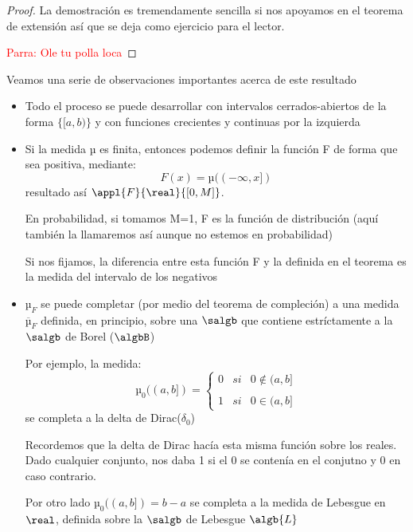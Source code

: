 \documentclass{apuntes}
\begin{document}
\begin{proof}
La demostración es tremendamente sencilla si nos apoyamos en el teorema de extensión así que se deja como ejercicio para el lector.

\textcolor{red}{Parra: Ole tu polla loca}
\end{proof}

Veamos una serie de observaciones importantes acerca de este resultado
\begin{obs}
\begin{itemize}
\item Todo el proceso se puede desarrollar con intervalos cerrados-abiertos de la forma $\{[a,b)\}$ y con funciones crecientes y continuas por la izquierda

\item Si la medida µ es finita, entonces podemos definir la función F de forma que sea positiva, mediante:
\[F(x)=µ((- \infty, x])\]
resultado así $\appl{F}{\real}{[0,M]}$.

En probabilidad, si tomamos M=1, F es la función de distribución (aquí también la llamaremos así aunque no estemos en probabilidad)

Si nos fijamos, la diferencia entre esta función F y la definida en el teorema es la medida del intervalo de los negativos

\item $µ_F$ se puede completar (por medio del teorema de compleción) a una medida $\overline{µ}_F$ definida, en principio, sobre una $\salgb$ que contiene estríctamente a la $\salgb$ de Borel ($\algbB$)

Por ejemplo, la medida:
\[µ_0((a,b])= \left\{ \begin{array}{lcc}
            0 &   si  & 0 \notin (a,b] \\
             \\  1 &  si & 0 \in (a,b]
             \end{array}
   \right.\]
se completa a la delta de Dirac($\delta_0$)

Recordemos que la delta de Dirac hacía esta misma función sobre los reales. Dado cualquier conjunto, nos daba 1 si el 0 se contenía en el conjutno y 0 en caso contrario.

Por otro lado $µ_0((a,b])=b-a$ se completa a la medida de Lebesgue en $\real$, definida sobre la $\salgb$ de Lebesgue $\algb{L}$
\end{itemize}
\end{obs}
\end{document}
